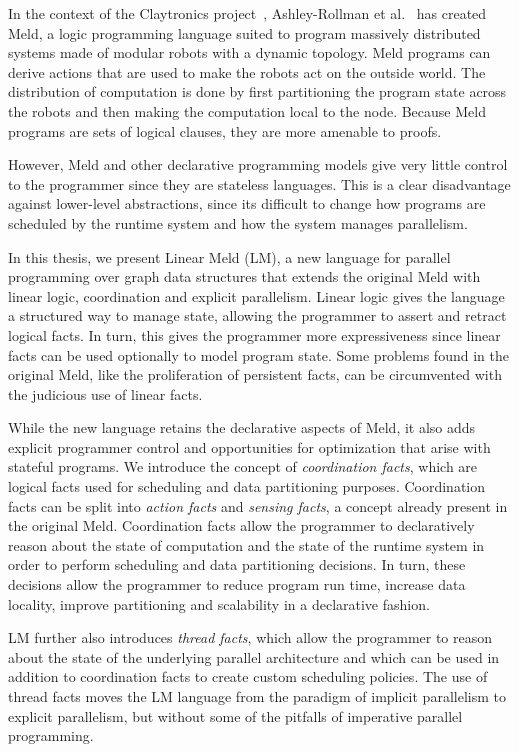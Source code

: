 In the context of the Claytronics project~\cite{goldstein-computer05},
Ashley-Rollman et al.~\cite{ashley-rollman-iclp09,
ashley-rollman-derosa-iros07wksp} has created Meld, a logic programming
language suited to program massively distributed systems made of modular
robots with a dynamic topology.  Meld programs can derive actions that are
used to make the robots act on the outside world. The distribution of
computation is done by first partitioning the program state across the
robots and then making the computation local to the node. Because Meld
programs are sets of logical clauses, they are more amenable to proofs.

However, Meld and other declarative programming models give very little control
to the programmer since they are stateless languages.  This is a clear
disadvantage against lower-level abstractions, since its difficult to change how
programs are scheduled by the runtime system and how the system manages
parallelism.

In this thesis, we present Linear Meld (LM), a new language for parallel
programming over graph data structures that extends the original Meld with
linear logic, coordination and explicit parallelism. Linear logic gives the
language a structured way to manage state, allowing the programmer to assert and
retract logical facts. In turn, this gives the programmer more expressiveness
since linear facts can be used optionally to model program state. Some problems
found in the original Meld, like the proliferation of persistent facts, can be
circumvented with the judicious use of linear facts.

While the new language retains the declarative aspects of Meld, it also adds
explicit programmer control and opportunities for optimization that arise with
stateful programs. We introduce the concept of \emph{coordination facts}, which
are logical facts used for scheduling and data partitioning purposes.
Coordination facts can be split into \emph{action facts} and \emph{sensing
facts}, a concept already present in the original Meld. Coordination facts allow
the programmer to declaratively reason about the state of computation and the
state of the runtime system in order to perform scheduling and data partitioning
decisions. In turn, these decisions allow the programmer to reduce program run
time, increase data locality, improve partitioning and scalability in a
declarative fashion.

LM further also introduces \emph{thread facts}, which allow the programmer to
reason about the state of the underlying parallel architecture and which can be
used in addition to coordination facts to create custom scheduling policies. The
use of thread facts moves the LM language from the paradigm of implicit
parallelism to explicit parallelism, but without some of the pitfalls of
imperative parallel programming.

